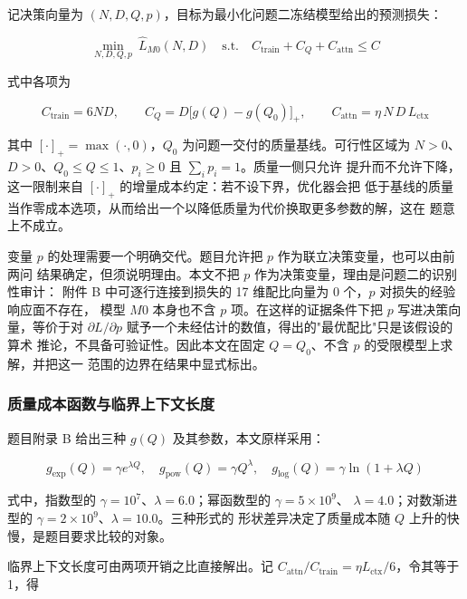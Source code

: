 \documentclass[bwprint]{gmcmthesis}
\numberwithin{equation}{section}
\numberwithin{figure}{section}
\numberwithin{table}{section}
\begin{document}
记决策向量为 $(N,D,Q,p)$，目标为最小化问题二冻结模型给出的预测损失：

\begin{equation}
\min_{N,D,Q,p}\ \hat L_{M0}(N,D)
\quad\text{s.t.}\quad
C_{\mathrm{train}}+C_Q+C_{\mathrm{attn}}\le C
\end{equation}

式中各项为

\begin{equation}
C_{\mathrm{train}}=6ND,\qquad
C_Q=D\bigl[g(Q)-g(Q_0)\bigr]_+,\qquad
C_{\mathrm{attn}}=\eta\,N\,D\,L_{\mathrm{ctx}}
\end{equation}

其中 $[\cdot]_+=\max(\cdot,0)$，$Q_0$ 为问题一交付的质量基线。可行性区域为
$N>0$、$D>0$、$Q_0\le Q\le 1$、$p_i\ge0$ 且 $\sum_i p_i=1$。质量一侧只允许
提升而不允许下降，这一限制来自 $[\cdot]_+$ 的增量成本约定：若不设下界，优化器会把
低于基线的质量当作零成本选项，从而给出一个以降低质量为代价换取更多参数的解，这在
题意上不成立。

变量 $p$ 的处理需要一个明确交代。题目允许把 $p$ 作为联立决策变量，也可以由前两问
结果确定，但须说明理由。本文不把 $p$ 作为决策变量，理由是问题二的识别性审计：
附件 B 中可逐行连接到损失的 17 维配比向量为 0 个，$p$ 对损失的经验响应面不存在，
模型 $M0$ 本身也不含 $p$ 项。在这样的证据条件下把 $p$ 写进决策向量，等价于对
$\partial L/\partial p$ 赋予一个未经估计的数值，得出的"最优配比"只是该假设的算术
推论，不具备可验证性。因此本文在固定 $Q=Q_0$、不含 $p$ 的受限模型上求解，并把这一
范围的边界在结果中显式标出。

\subsubsection{质量成本函数与临界上下文长度}

题目附录 B 给出三种 $g(Q)$ 及其参数，本文原样采用：

\begin{equation}
g_{\exp}(Q)=\gamma e^{\lambda Q},\quad
g_{\mathrm{pow}}(Q)=\gamma Q^{\lambda},\quad
g_{\log}(Q)=\gamma\ln(1+\lambda Q)
\end{equation}

式中，指数型的 $\gamma=10^{7}$、$\lambda=6.0$；幂函数型的 $\gamma=5\times10^{9}$、
$\lambda=4.0$；对数渐进型的 $\gamma=2\times10^{9}$、$\lambda=10.0$。三种形式的
形状差异决定了质量成本随 $Q$ 上升的快慢，是题目要求比较的对象。

临界上下文长度可由两项开销之比直接解出。记 $C_{\mathrm{attn}}/C_{\mathrm{train}}
=\eta L_{\mathrm{ctx}}/6$，令其等于 1，得
\end{document}
